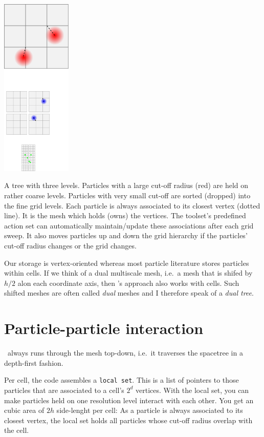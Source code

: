 \begin{center}
 \includegraphics[width=0.25\textwidth]{61_pidt/dual-tree.pdf}
\end{center}

\noindent
A tree with three levels.
Particles with a large cut-off radius (red) are held on rather coarse levels.
Particles with very small cut-off are sorted (dropped) into the fine grid
levels.
Each particle is always associated to its closest vertex (dotted line).
It is the mesh which holds (owns) the vertices.
The toolset's predefined action set can automatically maintain/update these
associations after each grid sweep.
It also moves particles up and down the grid hierarchy if the particles' cut-off
radius changes or the grid changes.



\begin{definition}
  Our storage is vertex-oriented whereas most particle literature stores
  particles within cells.
  If we think of a dual multiscale mesh, i.e.~a mesh that is shifed by $h/2$
  alon each coordinate axis, then \Peano's approach also works with cells.
  Such shifted meshes are often called \emph{dual} meshes and I therefore speak
  of a \emph{dual tree}.
\end{definition}



\section{Particle-particle interaction}


\Peano\ always runs through the mesh top-down, i.e.~it traverses the spacetree
in a depth-first fashion.


Per cell, the code assembles a \texttt{local set}. 
This is a list of pointers to those particles that are associated to a cell's
$2^d$ vertices.
With the local set, you can make particles held on one resolution level
interact with each other.
You get an cubic area of $2h$ side-lenght per cell:
As a particle is always associated to its closest vertex, the local set holds all particles whose cut-off radius overlap with the cell. 


